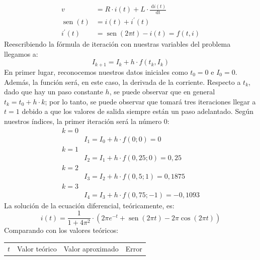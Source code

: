 \begin{questions}
    \begin{align*}
        v                     & =R \cdot i(t)+L \cdot \frac{\mathrm{~d} i(t)}{\mathrm{dt}} \\
        \operatorname{sen}(t) & =i(t)+i^{\prime}(t)                                        \\
        i^{\prime}(t)         & =\operatorname{sen}(2 \pi t)-i(t)=f(t, i)
    \end{align*}
    Reescribiendo la fórmula de iteración con nuestras variables del problema llegamos a:
    \begin{equation*}
        I_{k+1}=I_k+h \cdot f\left(t_k, I_k\right)
    \end{equation*}
    En primer lugar, reconocemos nuestros datos iniciales como $t_0=0$ e $I_0=0$.
    Además, la función será, en este caso, la derivada de la corriente. Respecto a $t_k$, dado que hay un paso constante $h$, se puede observar que en general $t_k=t_0+h \cdot k$; por lo tanto, se puede observar que tomará tres iteraciones llegar a $t=1$ debido a que los valores de salida siempre están un paso adelantado. Según nuestros índices, la primer iteración será la número $0$:
    \begin{align*}
        k=0 &                                     \\
            & I_1=I_0+h \cdot f(0 ; 0)=0          \\
        k=1 &                                     \\
            & I_2=I_1+h \cdot f(0,25 ; 0)=0,25    \\
        k=2 &                                     \\
            & I_3=I_2+h \cdot f(0,5 ; 1)=0,1875   \\
        k=3 &                                     \\
            & I_4=I_3+h \cdot f(0,75 ;-1)=-0,1093
    \end{align*}
    La solución de la ecuación diferencial, teóricamente, es:
    \begin{equation*}
        i(t)=\frac{1}{1+4 \pi^2} \cdot\left(2 \pi e^{-t}+\operatorname{sen}(2 \pi t)-2 \pi \cos (2 \pi t)\right)
    \end{equation*}
    Comparando con los valores teóricos:
    \begin{table}[ht!]
        \centering
        \begin{tabular}{|c|c|c|c|}
            \hline$t$ & Valor teórico & Valor aproximado & Error  \\

\end{tabular}
\end{table}
\end{questions}
